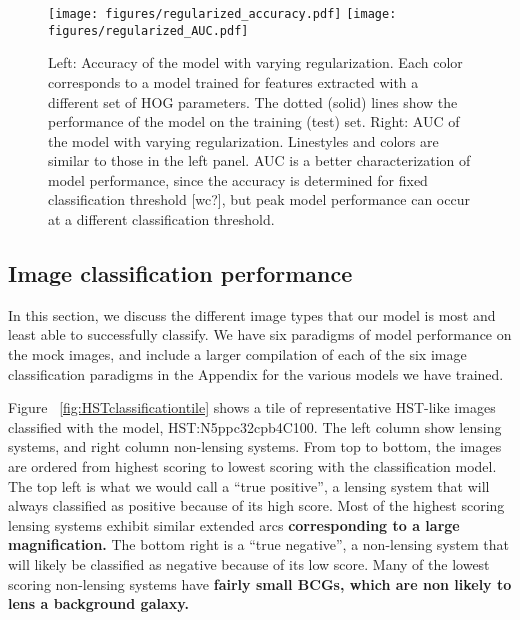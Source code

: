 \documentclass{emulateapj}
\newcommand{\todo}[1]{{\bf\color{blue} #1}}
\begin{document}
\begin{figure*}[t]\label{fig:regularization}
\begin{center}
\texttt{[image: figures/regularized\_accuracy.pdf]}\hspace{-20pt}
\texttt{[image: figures/regularized\_AUC.pdf]}
\caption{Left: Accuracy of the model with varying regularization.
  Each color corresponds to a model trained for features extracted
  with a different set of HOG parameters.  The dotted (solid) lines
  show the performance of the model on the training (test) set.
  Right: AUC of the model with varying regularization.  Linestyles and
  colors are similar to those in the left panel.  AUC is a better
  characterization of model performance, since the accuracy is
  determined for fixed classification threshold [wc?], but peak model
  performance can occur at a different classification threshold.}
\end{center}
\end{figure*}


\subsection{Image classification performance}\label{sec:performance}

In this section, we discuss the different image types that our model
is most and least able to successfully classify.  We have six
paradigms of model performance on the mock images, and include a
larger compilation of each of the six image classification paradigms
in the Appendix for the various models we have trained.

Figure ~\ref{fig:HSTclassificationtile} shows a tile of representative
HST-like images classified with the model, HST:N5ppc32cpb4C100.  The
left column show lensing systems, and right column non-lensing
systems.  From top to bottom, the images are ordered from highest
scoring to lowest scoring with the classification model.  The top left
is what we would call a ``true positive'', a lensing system that will
always classified as positive because of its high score.  Most of the
highest scoring lensing systems exhibit similar extended arcs
\todo{corresponding to a large magnification.}  The bottom right is a
``true negative'', a non-lensing system that will likely be classified
as negative because of its low score.  Many of the lowest scoring
non-lensing systems have \todo{fairly small BCGs, which are non likely
  to lens a background galaxy.}
\end{document}
